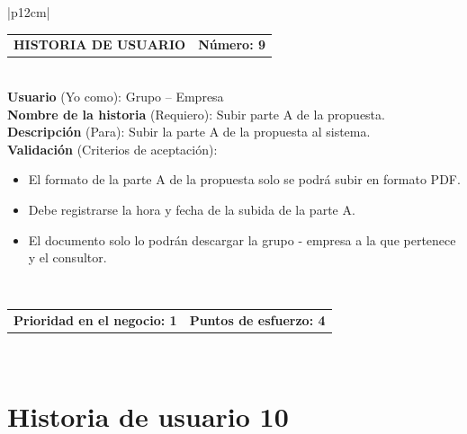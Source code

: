 \documentclass[11pt,letterpaper]{report}
\begin{document}
	\begin{center}	
		\begin{tabular}{|p{12cm}|}
			\hline
			\begin{tabular}{c|c}
				\textbf{HISTORIA DE USUARIO} & \textbf{Número: 9} \\
			\end{tabular} \\ \hline
			\textbf{Usuario} (Yo como): Grupo – Empresa \\ \hline
			\textbf{Nombre de la historia} (Requiero): Subir parte A de la propuesta. \\ \hline
			\textbf{Descripción} (Para): Subir la parte A de la propuesta al sistema. \\ \hline
			\textbf{Validación} (Criterios de aceptación): \\
			\begin{minipage}{12cm}
				\begin{itemize}
					\item El formato de la parte A de la propuesta solo se podrá subir en formato PDF.
					\item Debe registrarse la hora y fecha de la subida de la parte A.
					\item El documento solo lo podrán descargar la grupo - empresa a la que pertenece y el consultor.
				\end{itemize}
			\end{minipage} \\ \hline
			\begin{tabular}{c|c}
				\textbf{Prioridad en el negocio: 1} & \textbf{Puntos de esfuerzo: 4} \\
			\end{tabular} \\ \hline
		\end{tabular}
	\end{center}
	
	\section{Historia de usuario 10}
	
\end{document}
